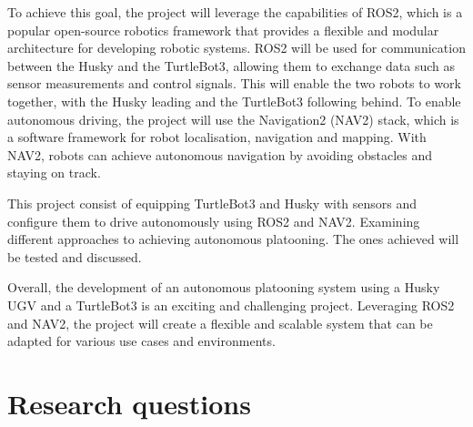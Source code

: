 To achieve this goal, the project will leverage the capabilities of ROS2, which is a popular open-source robotics framework that provides a flexible and modular architecture for developing robotic systems. ROS2 will be used for communication between the Husky and the TurtleBot3, allowing them to exchange data such as sensor measurements and control signals. This will enable the two robots to work together, with the Husky leading and the TurtleBot3 following behind.
To enable autonomous driving, the project will use the Navigation2 (NAV2) stack, which is a software framework for robot localisation, navigation and mapping. With NAV2, robots can achieve autonomous navigation by avoiding obstacles and staying on track.

This project consist of equipping TurtleBot3 and Husky with sensors and configure them to drive autonomously using ROS2 and NAV2. Examining different approaches to achieving autonomous platooning. The ones achieved will be tested and discussed.  

Overall, the development of an autonomous platooning system using a Husky UGV and a TurtleBot3 is an exciting and challenging project. Leveraging ROS2 and NAV2, the project will create a flexible and scalable system that can be adapted for various use cases and environments.

\section{Research questions}



